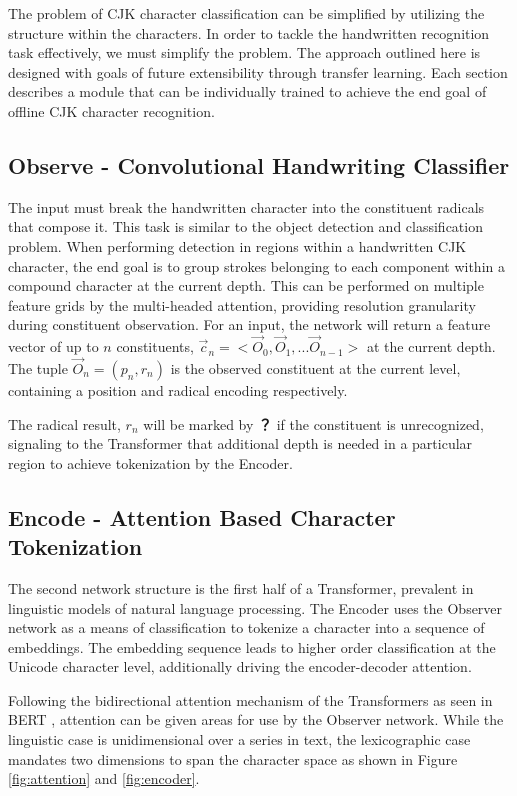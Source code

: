 The problem of CJK character classification can be simplified by utilizing the structure within the characters. In order to tackle the handwritten recognition task effectively, we must simplify the problem. The approach outlined here is designed with goals of future extensibility through transfer learning. Each section describes a module that can be individually trained to achieve the end goal of offline CJK character recognition.

\subsection{Observe - Convolutional Handwriting Classifier}
The input must break the handwritten character into the constituent radicals that compose it. This task is similar to the object detection and classification problem. When performing detection in regions within a handwritten CJK character, the end goal is to group strokes belonging to each component within a compound character at the current depth. This can be performed on multiple feature grids by the multi-headed attention, providing resolution granularity during constituent observation. For an input, the network will return a feature vector of up to \(n\) constituents, $\vec{c}_n = <\vec{O}_0, \vec{O}_1, ... \vec{O}_{n-1}>$ at the current depth. The tuple $\vec{O}_n = (p_n,r_n)$ is the observed constituent at the current level, containing a position and radical encoding respectively.

The radical result, $r_n$ will be marked by \textbf{？} if the constituent is unrecognized, signaling to the Transformer that additional depth is needed in a particular region to achieve tokenization by the Encoder.

\subsection{Encode - Attention Based Character Tokenization}
The second network structure is the first half of a Transformer, prevalent in linguistic models of natural language processing\cite{transformers}. The Encoder uses the Observer network as a means of classification to tokenize a character into a sequence of embeddings. The embedding sequence leads to higher order classification at the Unicode character level, additionally driving the encoder-decoder attention.

Following the bidirectional attention mechanism of the Transformers as seen in BERT \cite{bert}, attention can be given areas for use by the Observer network. While the linguistic case is unidimensional over a series in text, the lexicographic case mandates two dimensions to span the character space as shown in Figure \ref{fig:attention} and \ref{fig:encoder}.

